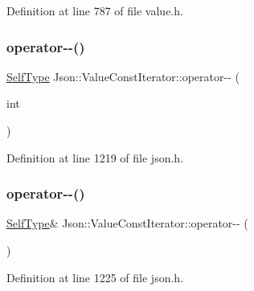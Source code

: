 Definition at line 787 of file value.\+h.

\hypertarget{class_json_1_1_value_const_iterator_a94935961e9331c6f7b907b05ec8df75e}{}\label{class_json_1_1_value_const_iterator_a94935961e9331c6f7b907b05ec8df75e} 
\subsubsection{\texorpdfstring{operator-\/-\/()}{operator--()}\hspace{0.1cm}{\footnotesize\ttfamily [3/4]}}
{\footnotesize\ttfamily \hyperlink{class_json_1_1_value_iterator_base_a9d2a940d03ea06d20d972f41a89149ee}{Self\+Type} Json\+::\+Value\+Const\+Iterator\+::operator-\/-\/ (\begin{DoxyParamCaption}\item[{int}]{ }\end{DoxyParamCaption})\hspace{0.3cm}{\ttfamily [inline]}}



Definition at line 1219 of file json.\+h.

\hypertarget{class_json_1_1_value_const_iterator_a31415e44e44e56fb2bfda7e8bb784646}{}\label{class_json_1_1_value_const_iterator_a31415e44e44e56fb2bfda7e8bb784646} 
\subsubsection{\texorpdfstring{operator-\/-\/()}{operator--()}\hspace{0.1cm}{\footnotesize\ttfamily [4/4]}}
{\footnotesize\ttfamily \hyperlink{class_json_1_1_value_iterator_base_a9d2a940d03ea06d20d972f41a89149ee}{Self\+Type}\& Json\+::\+Value\+Const\+Iterator\+::operator-\/-\/ (\begin{DoxyParamCaption}{ }\end{DoxyParamCaption})\hspace{0.3cm}{\ttfamily [inline]}}



Definition at line 1225 of file json.\+h.

\hypertarget{class_json_1_1_value_const_iterator_a3c608ae53c192ee846eb265bae1cfeec}{}\label{class_json_1_1_value_const_iterator_a3c608ae53c192ee846eb265bae1cfeec} 
